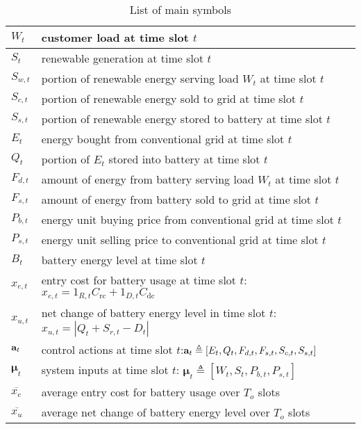 \documentclass[journal]{IEEEtran}
\def\mubf{\boldsymbol \mu }
\def\abf{{\bf a}}
\begin{document}
\begin{table}[t]
\renewcommand{\arraystretch}{1.4}
\centering
\caption{List of main symbols}\label{tab:num}
\begin{tabular}{p{0.7cm}| p{7.1cm}}
\hline\hline
$W_t$ & customer load at time slot $t$\\
\hline
$S_t$ & renewable generation at time slot $t$ \\
\hline
$S_{w,t}$ &  portion of renewable energy serving load $W_t$ at time slot $t$\\
\hline
$S_{c,t}$ & portion of renewable energy sold to grid at time slot $t$\\
\hline
$S_{s,t}$ & portion of renewable energy stored to battery at time slot $t$\\
\hline
$E_t$ & energy bought from conventional grid at time slot $t$ \\
\hline
$Q_t$ & portion of $E_t$ stored into battery at time slot $t$\\
\hline
$F_{d,t}$ & amount of energy from battery serving load $W_t$ at time slot $t$\\
\hline
$F_{s,t}$ & amount of energy from battery sold to grid at time slot $t$\\
\hline
$P_{b,t}$ & energy unit buying price from conventional grid at time slot $t$\\
\hline
$P_{s,t}$ & energy unit selling price to conventional grid at time slot $t$\\
\hline
$B_t$ & battery energy level at time slot $t$\\
\hline
$x_{e,t}$ & entry cost for battery usage at time slot $t$:\newline  $x_{e,t}= 1_{R,t}C_{\textrm{rc}}+1_{D,t}C_{\textrm{dc}}$\\
\hline
$x_{u,t}$ &  net change of battery energy level  in time slot $t$:\newline $x_{u,t}=
\left|Q_t+S_{r,t}-D_t\right|$\\
\hline
$\abf_t$ & control actions at time slot $t$:\newline $\abf_t\triangleq[E_t,Q_t,F_{d,t},F_{s,t},S_{c,t},S_{s,t}]$\\
\hline
$\mubf_t$ & system inputs  at time slot $t$: $\mubf_t\triangleq[W_t,S_t,P_{b,t},P_{s,t}]$\\
\hline
$\overline{x_e}$ & average entry cost for battery usage over  $T_o$ slots\\
\hline
$\overline{x_u}$ & average net change of battery energy level over  $T_o$  slots\\

\end{tabular}
\end{table}
\end{document}
